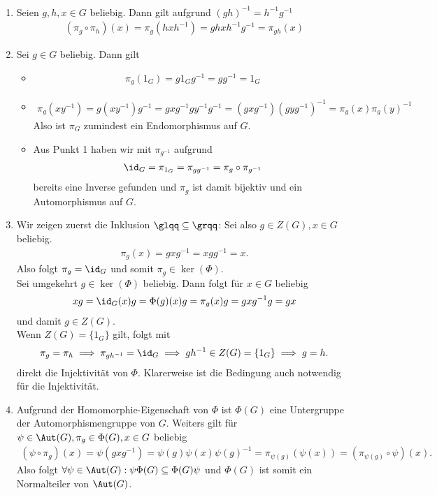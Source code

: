 \begin{solution}
\leavevmode \\
\begin{enumerate}
  \item Seien $g,h,x \in G$ beliebig. Dann gilt aufgrund $(gh)^{-1} = h^{-1}g^{-1}$
  \begin{align*}
    (\pi_g \circ \pi_h)(x) = \pi_g(hxh^{-1}) = ghxh^{-1}g^{-1} = \pi_{gh}(x)
  \end{align*}
  \item Sei $g \in G$ beliebig. Dann gilt
  \begin{itemize}
    \item \begin{align*}
      \pi_g(1_G) = g1_Gg^{-1} = gg^{-1} = 1_G
    \end{align*}
    \item \begin{align*}
      \pi_g(xy^{-1}) = g(xy^{-1})g^{-1} =  gxg^{-1}gy^{-1}g^{-1} =  (gxg^{-1})(gyg^{-1})^{-1} = \pi_g(x)\pi_g(y)^{-1}
    \end{align*}
    Also ist $\pi_G$ zumindest ein Endomorphismus auf $G$.
    \item Aus Punkt 1 haben wir mit $\pi_{g^{-1}}$ aufgrund
    \begin{align*}
      \id_G = \pi_{1_G} = \pi_{gg^{-1}} = \pi_g \circ \pi_{g^{-1}}
    \end{align*}
    bereits eine Inverse gefunden und $\pi_g$ ist damit bijektiv und ein Automorphismus auf $G$.
  \end{itemize}
\item Wir zeigen zuerst die Inklusion $\glqq \subseteq \grqq$: Sei also $g \in Z(G), x \in G$ beliebig.
\begin{align*}
  \pi_g(x) = gxg^{-1} = xgg^{-1} = x.
\end{align*}
Also folgt $\pi_g = \id_G$ und somit $\pi_g \in \ker(\Phi)$. \\
Sei umgekehrt $g \in \ker(\Phi)$ beliebig. Dann folgt für $x \in G$ beliebig
\begin{align*}
  xg = \id_G(x)g = \Phi(g)(x)g = \pi_g(x)g= gxg^{-1}g = gx
\end{align*}
und damit $g \in Z(G)$. \\
Wenn $Z(G) = \{1_G\}$ gilt, folgt mit
\begin{align*}
  \pi_g = \pi_h \implies \pi_{gh^{-1}} = \id_G \implies gh^{-1} \in Z(G) = \{1_G\} \implies g = h.
\end{align*}
direkt die Injektivität von $\Phi$. Klarerweise ist die Bedingung auch notwendig für die Injektivität.
\item Aufgrund der Homomorphie-Eigenschaft von $\Phi$ ist $\Phi(G)$ eine Untergruppe
der Automorphismengruppe von $G$. Weiters gilt für $\psi \in \Aut(G), \pi_g \in \Phi(G), x\in G$ beliebig
\begin{align*}
  (\psi \circ \pi_g) (x)= \psi(gxg^{-1}) = \psi(g)\psi(x)\psi(g)^{-1} = \pi_{\psi(g)}(\psi(x)) = (\pi_{\psi(g)} \circ \psi)(x).
\end{align*}
Also folgt $\forall \psi \in \Aut(G): \psi\Phi(G) \subseteq \Phi(G)\psi$ und $\Phi(G)$ ist somit ein Normalteiler von $\Aut(G)$.
\end{enumerate}

\end{solution}
